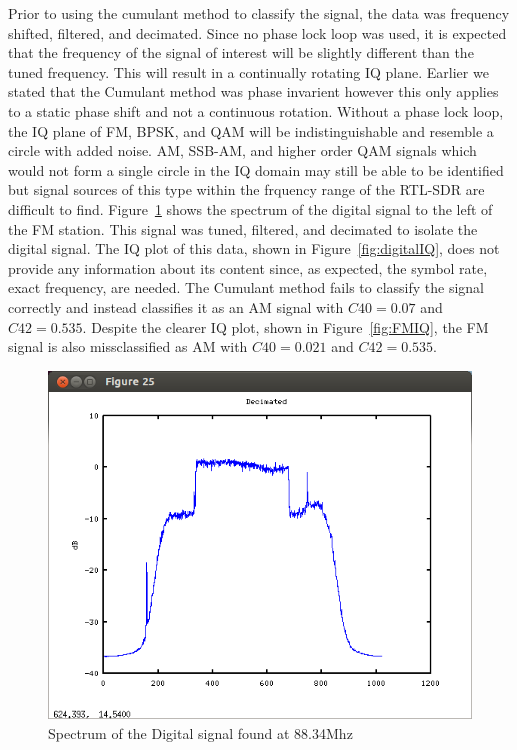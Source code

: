 Prior to using the cumulant method to classify the signal, the data was
frequency shifted, filtered, and decimated.  Since no phase lock loop was used,
it is expected that the frequency of the signal of interest will be slightly
different than the tuned frequency.  This will result in a continually rotating
IQ plane.
Earlier we stated that the Cumulant method was phase invarient however this only
applies to a static phase shift and not a continuous rotation.  Without a phase
lock loop, the IQ plane of FM, BPSK, and QAM will be indistinguishable and
resemble a circle with added noise.
AM, SSB-AM, and higher order QAM signals which would not form a single circle in
the IQ domain may still be able to be identified but signal sources of this type
within the frquency range of the RTL-SDR are difficult to find.
Figure~\ref{fig:digitalSignal} shows the spectrum of the digital signal to the
left of the FM station.  This signal was tuned, filtered, and decimated to
isolate the digital signal.  The IQ plot of this data, shown in
Figure~\ref{fig:digitalIQ}, does not provide any information about its content
since, as expected, the symbol rate, exact frequency, are needed.  The Cumulant
method fails to classify the signal correctly and instead classifies it as an AM
signal with $C40 = 0.07$ and $C42 = 0.535$.
Despite the clearer IQ plot, shown in Figure~\ref{fig:FMIQ}, the FM signal is
also missclassified as AM with $C40 = 0.021$ and $C42 =  0.535$.


\begin{figure}
\centering
\includegraphics[width=\linewidth]{../img/Report_Decimated_Digital_Signal.png}
\caption{Spectrum of the Digital signal found at 88.34Mhz}
\label{fig:digitalSignal}
\end{figure}


